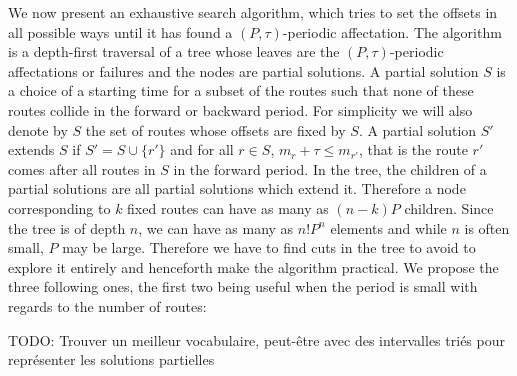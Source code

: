 \documentclass[a4paper,10pt]{article}
\newcommand{\todo}[1]{{\color{red} TODO: {#1}}}
\begin{document}
% 	    
      We now present an exhaustive search algorithm, which tries to set the offsets in all possible ways until it has found
      a $(P,\tau)$-periodic affectation. The algorithm is a depth-first traversal of a tree whose leaves are the $(P,\tau)$-periodic
      affectations or failures and the nodes are partial solutions. A partial solution $S$ is a choice of a starting time for a subset of the routes such that none of these routes collide in the forward or backward period. For simplicity we will also denote by $S$ the set of routes whose offsets are fixed by $S$. A partial solution $S'$ extends $S$ if $S' = S \cup \{r'\}$ and for all $r \in S$, $m_r + \tau \leq m_{r'}$, that is the route $r'$ comes after all routes in $S$ in the forward period. In the tree, the children of a partial solutions are all partial solutions which extend it. Therefore a node corresponding to $k$ fixed routes can have as many as $(n-k)P$ children. Since the tree is of depth $n$, we can have as many as $n!P^n$ elements and while $n$ is often small, $P$ may be large.  Therefore we have to find cuts in the tree to avoid to explore it entirely and henceforth make the algorithm practical. We propose the three following ones, the first two being useful when the period is small with regards to the number of routes:
      
      
      \todo{       Trouver un meilleur vocabulaire, peut-être avec des intervalles triés pour représenter les solutions partielles}
      
\end{document}

